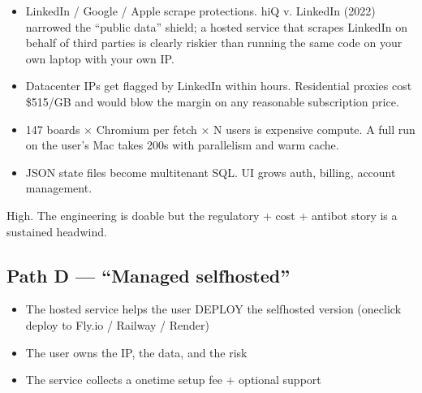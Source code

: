 \documentclass[a4paper,11pt,english]{sphinxmanual}
\begin{document}
\sphinxAtStartPar
{}
\begin{itemize}
\item {} 
\sphinxAtStartPar
{} LinkedIn / Google / Apple scrape protections. hiQ v.
LinkedIn (2022) narrowed the “public data” shield; a hosted service
that scrapes LinkedIn on behalf of third parties is clearly riskier
than running the same code on your own laptop with your own IP.

\item {} 
\sphinxAtStartPar
{} Datacenter IPs get flagged by LinkedIn within hours.
Residential proxies cost \$5\sphinxhyphen{}15/GB and would blow the margin on any
reasonable subscription price.

\item {} 
\sphinxAtStartPar
{} 147 boards × Chromium per fetch × N users is
expensive compute. A full run on the user’s Mac takes 200s with
parallelism and warm cache.

\item {} 
\sphinxAtStartPar
{} JSON state files become multi\sphinxhyphen{}tenant SQL. UI
grows auth, billing, account management.

\end{itemize}

\sphinxAtStartPar
{} High. The engineering is doable but the regulatory +
cost + anti\sphinxhyphen{}bot story is a sustained headwind.


\subsection{Path D — “Managed self\sphinxhyphen{}hosted”}
\label{\detokenize{analysis:path-d-managed-self-hosted}}\begin{itemize}
\item {} 
\sphinxAtStartPar
The hosted service helps the user DEPLOY the self\sphinxhyphen{}hosted version
(one\sphinxhyphen{}click deploy to Fly.io / Railway / Render)

\item {} 
\sphinxAtStartPar
The user owns the IP, the data, and the risk

\item {} 
\sphinxAtStartPar
The service collects a one\sphinxhyphen{}time setup fee + optional support

\end{itemize}
\end{document}
